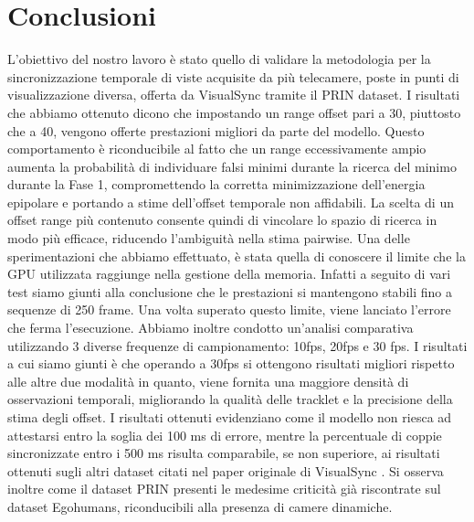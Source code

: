 \graphicspath{{chapters/chapter6/img}}
\chapter{Conclusioni} \label{conclusioni}
L'obiettivo del nostro lavoro è stato quello di validare la metodologia per la sincronizzazione temporale di viste acquisite da più telecamere, poste in punti di visualizzazione diversa, offerta da VisualSync \cite{visualsync} tramite il PRIN dataset. I risultati che abbiamo ottenuto dicono che impostando un range offset pari a 30, piuttosto che a 40, vengono offerte prestazioni migliori da parte del modello. Questo comportamento è riconducibile al fatto che un range eccessivamente ampio aumenta la probabilità di individuare falsi minimi durante la ricerca del minimo durante la Fase 1, compromettendo la corretta minimizzazione dell'energia epipolare e portando a stime dell'offset temporale non affidabili. La scelta di un offset range più contenuto consente quindi di vincolare lo spazio di ricerca in modo più efficace, riducendo l'ambiguità nella stima pairwise. Una delle sperimentazioni che abbiamo effettuato, è stata quella di conoscere il limite che la GPU utilizzata raggiunge nella gestione della memoria. Infatti a seguito di vari test siamo giunti alla conclusione che le prestazioni si mantengono stabili fino a sequenze di 250 frame. Una volta superato questo limite, viene lanciato l'errore  che ferma l'esecuzione. Abbiamo inoltre condotto un'analisi comparativa utilizzando 3 diverse frequenze di campionamento: 10fps, 20fps e 30 fps. I risultati a cui siamo giunti è che operando a 30fps si ottengono risultati migliori rispetto alle altre due modalità in quanto, viene fornita una maggiore densità di osservazioni temporali, migliorando la qualità delle tracklet e la precisione della stima degli offset. 
I risultati ottenuti evidenziano come il modello non riesca ad attestarsi entro la soglia dei 100 ms di errore, mentre la percentuale di coppie sincronizzate entro i 500 ms risulta comparabile, se non superiore, ai risultati ottenuti sugli altri dataset citati nel paper originale di VisualSync \cite{visualsync}. Si osserva inoltre come il dataset PRIN presenti le medesime criticità già riscontrate sul dataset Egohumans, riconducibili alla presenza di camere dinamiche.

